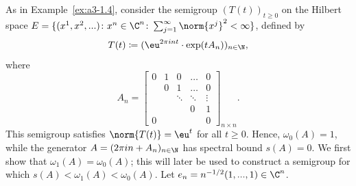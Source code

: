 \begin{example}\label{ex:a4-1.6} 
As in Example~\ref{ex:a3-1.4}, consider the semigroup $ (T(t))_{t \geq 0} $ on the Hilbert space $ E = \{(x^1, x^2, ...) \colon x^n \in \C^n\colon\sum_{j=1}^{\infty} \norm{x^j}^2 < \infty\} $, defined by 
\[{
T(t) \coloneq  (\eu^{2\pi i n t} \cdot \exp(t A_n))_{n \in \N}
},\]
where
\[
A_n =
\begin{bmatrix}
0 & 1 & 0 & \dots & 0 \\
& 0 & 1 & \dots & 0 \\
& & \ddots & \ddots & \vdots \\
& & & 0 & 1 \\
0 & & & & 0
\end{bmatrix}_{n \times n}.
\]
This semigroup satisfies $ \norm{T(t)} = \eu^{t} $ for all $t\ge 0$. Hence, $ \omega_{0}(A) = 1 $, while the generator $ A = (2\pi i n + A_n)_{n \in \N} $ has spectral bound $ s(A) = 0 $. 
We first show that $ \omega_1(A) = \omega_{0}(A) $; this will later be used to construct a semigroup for which $ s(A) < \omega_1(A) < \omega_{0}(A) $. 
Let $ e_n = n^{-1/2} (1, ..., 1) \in \C^n $. 
 

\end{example}
